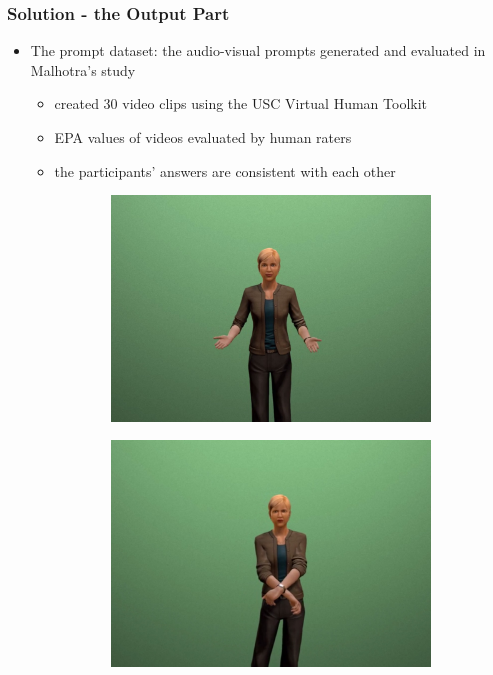 \documentclass{beamer}
\begin{document}
\begin{frame}
\frametitle{Solution - the Output Part}
\begin{itemize}
\item The prompt dataset: the audio-visual prompts generated and evaluated in Malhotra's study \cite{malhotra2014}
\begin{itemize}
\item created 30 video clips using the USC Virtual Human Toolkit
\item EPA values of videos evaluated by human raters
\item the participants' answers are consistent with each other
\end{itemize}
\begin{figure}[htb]
\centering
\begin{subfigure}[b]{.4\textwidth}
\includegraphics[width=\textwidth]{fig/prompt1.jpg}
\end{subfigure}
\begin{subfigure}[b]{.4\textwidth}
\includegraphics[width=\textwidth]{fig/prompt2.jpg}

\end{subfigure}
\end{figure}
\end{itemize}
\end{frame}
\end{document}
